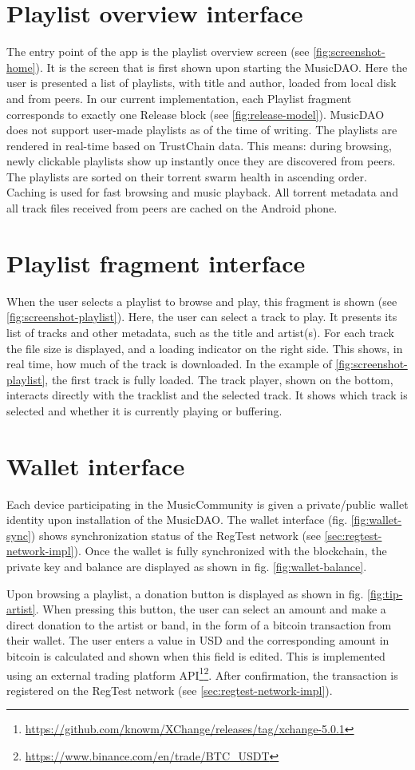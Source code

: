 \section{Playlist overview interface}
The entry point of the app is the playlist overview screen (see \ref{fig:screenshot-home}). It is the screen that is first shown upon starting the MusicDAO. Here the user is presented a list of playlists, with title and author, loaded from local disk and from peers. In our current implementation, each Playlist fragment corresponds to exactly one Release block (see \ref{fig:release-model}). MusicDAO does not support user-made playlists as of the time of writing. The playlists are rendered in real-time based on TrustChain data. This means: during browsing, newly clickable playlists show up instantly once they are discovered from peers. The playlists are sorted on their torrent swarm health in ascending order. Caching is used for fast browsing and music playback. All torrent metadata and all track files received from peers are cached on the Android phone. 
\section{Playlist fragment interface}
When the user selects a playlist to browse and play, this fragment is shown (see \ref{fig:screenshot-playlist}). Here, the user can select a track to play. It presents its list of tracks and other metadata, such as the title and artist(s). For each track the file size is displayed, and a loading indicator on the right side. This shows, in real time, how much of the track is downloaded. In the example of \ref{fig:screenshot-playlist}, the first track is fully loaded. The track player, shown on the bottom, interacts directly with the tracklist and the selected track. It shows which track is selected and whether it is currently playing or buffering.
\section{Wallet interface}
Each device participating in the MusicCommunity is given a private/public wallet identity upon installation of the MusicDAO. The wallet interface (fig. \ref{fig:wallet-sync}) shows synchronization status of the RegTest network (see \ref{sec:regtest-network-impl}). Once the wallet is fully synchronized with the blockchain, the private key and balance are displayed as shown in fig. \ref{fig:wallet-balance}. 

Upon browsing a playlist, a donation button is displayed as shown in fig. \ref{fig:tip-artist}. When pressing this button, the user can select an amount and make a direct donation to the artist or band, in the form of a bitcoin transaction from their wallet. The user enters a value in USD and the corresponding amount in bitcoin is calculated and shown when this field is edited. This is implemented using an external trading platform API\footnote{\url{https://github.com/knowm/XChange/releases/tag/xchange-5.0.1}}\footnote{\url{https://www.binance.com/en/trade/BTC_USDT}}. After confirmation, the transaction is registered on the RegTest network (see \ref{sec:regtest-network-impl}). 

